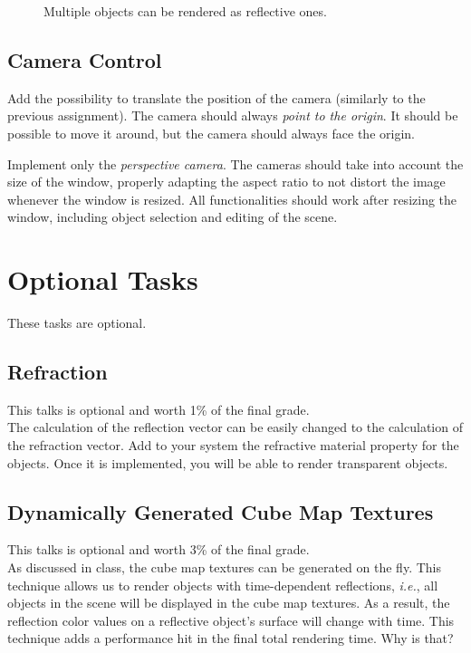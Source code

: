 \documentclass[11pt]{article}
\begin{document}
\begin{figure}[tbh]
  \centering
  \caption{Multiple objects can be rendered as reflective ones.}
  \label{fig:env-mapping2}
\end{figure}

\subsection{Camera Control}

Add the possibility to translate the position of the camera (similarly to the previous assignment). The camera should always \emph{point to the origin}. It should be possible to move it around, but the camera should always face the origin.

Implement only the \emph{perspective camera}. The cameras should take into account the size of the window, properly adapting the aspect ratio to not distort the image whenever the window is resized. All functionalities should work after resizing the window, including object selection and editing of the scene.

\section*{Optional Tasks}

These tasks are optional.

\subsection{Refraction}
This talks is optional and worth 1\% of the final grade.\\
The calculation of the reflection vector can be easily changed to the calculation of the refraction vector. 
Add to your system the refractive material property for the objects. Once it is implemented, you will be able to render transparent objects.

\subsection{Dynamically Generated Cube Map Textures}
This talks is optional and worth 3\% of the final grade.\\
As discussed in class, the cube map textures can be generated on the fly. This technique allows us to render objects with time-dependent reflections, \textit{i.e.}, all objects in the scene will be displayed in the cube map textures. As a result, the reflection color values on a reflective object's surface will change with time. 
This technique adds a performance hit in the final total rendering time. Why is that?

%
%
\end{document}
